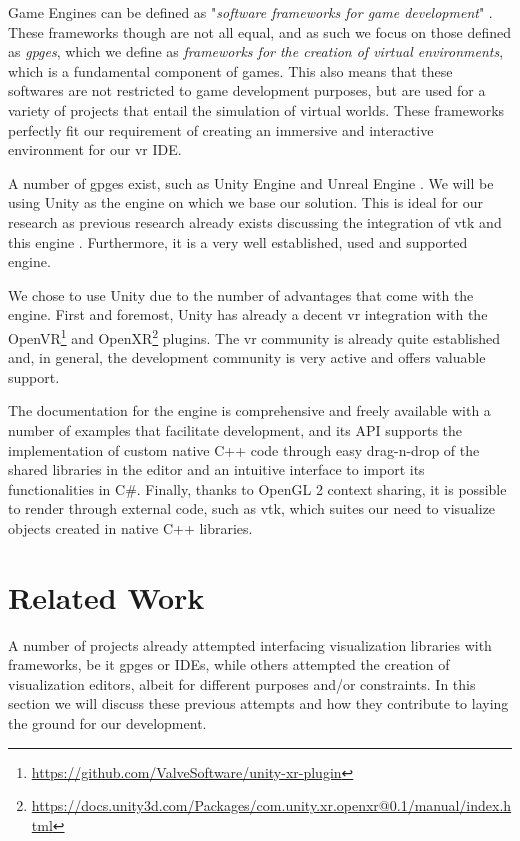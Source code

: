 Game Engines can be defined as "\textit{software frameworks for game development}" \cite{politowski2021game}. These frameworks though are not all equal, and as such we focus on those defined as \textit{\acrfull{gpge}s}, which we define as \textit{frameworks for the creation of virtual environments}, which is a fundamental component of games. This also means that these softwares are not restricted to game development purposes, but are used for a variety of projects that entail the simulation of virtual worlds. These frameworks perfectly fit our requirement of creating an immersive and interactive environment for our \acrshort{vr} IDE.

A number of \acrshort{gpge}s exist, such as Unity Engine \cite{haas2014history} and Unreal Engine \cite{unrealengine}. We will be using Unity as the engine on which we base our solution. This is ideal for our research as previous research already exists discussing the integration of \acrshort{vtk} and this engine \cite{wheeler_virtual_2018}. Furthermore, it is a very well established, used and supported engine.

We chose to use Unity due to the number of advantages that come with the engine. First and foremost, Unity has already a decent \acrshort{vr} integration with the OpenVR\footnote{\url{https://github.com/ValveSoftware/unity-xr-plugin}} and OpenXR\footnote{\url{https://docs.unity3d.com/Packages/com.unity.xr.openxr@0.1/manual/index.html}} plugins. The \acrshort{vr} community is already quite established and, in general, the development community is very active and offers valuable support. 

The documentation for the engine is comprehensive and freely available with a number of examples that facilitate development, and its API supports the implementation of custom native C++ code through easy drag-n-drop of the shared libraries in the editor and an intuitive interface to import its functionalities in C\#. Finally, thanks to OpenGL 2 context sharing, it is possible to render through external code, such as \acrshort{vtk}, which suites our need to visualize objects created in native C++ libraries.

\section{Related Work}
\label{sec:related-work}

A number of projects already attempted interfacing visualization libraries with frameworks, be it \acrshort{gpge}s or IDEs, while others attempted the creation of visualization editors, albeit for different purposes and/or constraints. In this section we will discuss these previous attempts and how they contribute to laying the ground for our development.

